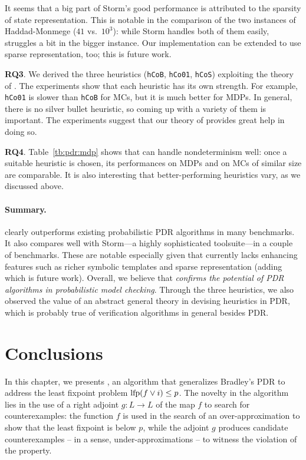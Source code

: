 It seems that a big part of Storm's good performance is attributed to the sparsity of state representation. This is notable in the comparison of the two instances of Haddad-Monmege ($41$ vs.\ $10^3$): while Storm handles both of them easily, \ADPDR{} struggles a bit in the bigger instance. Our implementation can be extended to use sparse representation, too; this is future work.

\textbf{RQ3}.
We derived the three heuristics (\verb|hCoB|, \verb|hCo01|, \verb|hCoS|) exploiting the theory of \ADPDR{}. The experiments show that each heuristic has its own strength. For example, \verb|hCo01| is slower than \verb|hCoB| for MCs, but it is much better for MDPs. In general, there is no silver bullet heuristic, so coming up with a variety of them is important. The experiments suggest that our theory of \ADPDR{} provides great help in doing so.

\textbf{RQ4}.
Table~\ref{tb:pdr:mdp} shows that \ADPDR{} can handle nondeterminism well: once a suitable heuristic is chosen, its performances on MDPs and on MCs of similar size are comparable. It is also interesting that better-performing heuristics vary, as we discussed above.

\paragraph{Summary.}
\ADPDR{} clearly outperforms existing probabilistic PDR algorithms in many benchmarks. It also compares well with Storm---a highly sophisticated toolsuite---in a couple of benchmarks. These are notable especially given that \ADPDR{} currently lacks enhancing features such as richer symbolic templates and sparse representation (adding which is future work). Overall, we believe that \ADPDR{} \emph{confirms the potential of PDR algorithms in probabilistic model checking}. Through the three heuristics, we also observed the value of an abstract general theory in devising heuristics in PDR, which is probably true of verification algorithms in general besides PDR.

\section{Conclusions}\label{sec:pdr:conclusions}
In this chapter, we presents \APDR{}, an algorithm that generalizes Bradley's PDR \cite{Bradley11} to address the least fixpoint problem $\text{lfp}(f\lor i) \le p$. The novelty in the algorithm lies in the use of a right adjoint $g\colon L \to L$ of the map $f$ to search for counterexamples: the function $f$ is used in the search of an over-approximation to show that the least fixpoint is below $p$, while the adjoint $g$ produces candidate counterexamples -- in a sense, under-approximations -- to witness the violation of the property.

